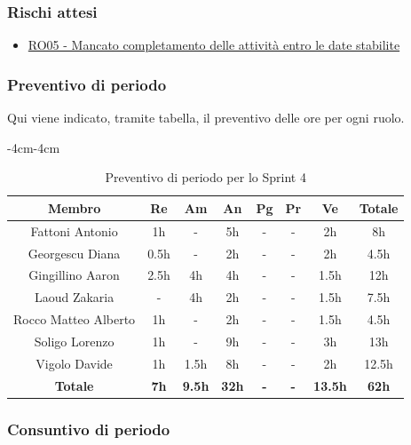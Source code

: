 \documentclass[a4paper,12pt]{article}
\begin{document}
\subsubsection{Rischi attesi}
\begin{itemize}
    \item \hyperref[RO05]{RO05 - Mancato completamento delle attività entro le date stabilite}
\end{itemize}

\subsubsection{Preventivo di periodo}
Qui viene indicato, tramite tabella, il preventivo delle ore per ogni ruolo.
\begin{table}[H]
    \begin{adjustwidth}{-4cm}{-4cm}
    \centering
    \begin{tabular}{|c|c|c|c|c|c|c|c|}
        \hline
        \textbf{Membro}& \textbf{Re} & \textbf{Am} & \textbf{An} & \textbf{Pg} & \textbf{Pr} & \textbf{Ve} & \textbf{Totale} \\
        \hline
        Fattoni Antonio & 1h & - & 5h & - & - & 2h & 8h \\
        \hline
        Georgescu Diana & 0.5h & - & 2h & - & - & 2h & 4.5h \\
        \hline
        Gingillino Aaron& 2.5h & 4h & 4h & - & - & 1.5h & 12h \\
        \hline
        Laoud Zakaria& - & 4h & 2h & - & - & 1.5h & 7.5h \\
        \hline
        Rocco Matteo Alberto & 1h & - & 2h & - & - & 1.5h & 4.5h \\
        \hline
        Soligo Lorenzo& 1h & - & 9h & - & - & 3h & 13h \\
        \hline
        Vigolo Davide & 1h & 1.5h & 8h & - & - & 2h & 12.5h \\
        \hline
        \textbf{Totale} & \textbf{7h} & \textbf{9.5h} & \textbf{32h} & \textbf{-} & \textbf{-} & \textbf{13.5h} & \textbf{62h} \\
        \hline
    \end{tabular}
    \caption{Preventivo di periodo per lo Sprint 4}
    \end{adjustwidth}
\end{table}

\subsubsection{Consuntivo di periodo}
\end{document}
